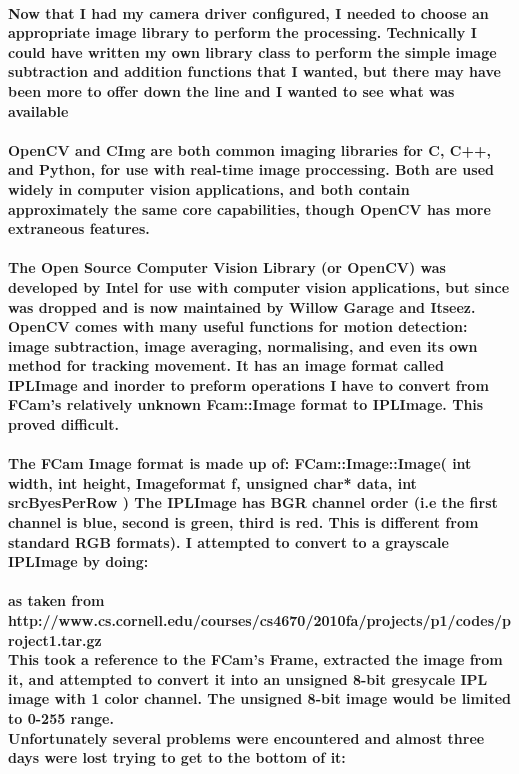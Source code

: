 \documentclass[11pt]{article} %
\begin{document}
\paragraph{Now that I had my camera driver configured, I needed to choose an appropriate image library to perform the processing. Technically I could have written my own library class to perform the simple image subtraction and addition functions that I wanted, but there may have been more to offer down the line and I wanted to see what was available}
\paragraph{OpenCV and CImg are both common imaging libraries for C, C++, and Python, for use with real-time image proccessing. 
Both are used widely in computer vision applications, and both contain approximately the same core capabilities, though OpenCV has more extraneous features.}
\paragraph{The Open Source Computer Vision Library (or OpenCV) was developed by Intel for use with computer vision applications, but since was dropped and is now maintained by Willow Garage and Itseez.
\\OpenCV comes with many useful functions for motion detection: image subtraction, image averaging, normalising, and even its own method for tracking movement. It has an image format called IPLImage and inorder to preform operations I have to convert from FCam's relatively unknown Fcam::Image format to IPLImage. This proved difficult.
}
\paragraph{The FCam Image format is made up of:
FCam::Image::Image(
     int width,
     int height,
     Imageformat f,
     unsigned char* data,
     int srcByesPerRow
)
The IPLImage has BGR channel order (i.e the first channel is blue, second is green, third is red. This is different from standard RGB formats). I attempted to convert to a grayscale IPLImage by doing:}

\paragraph{as taken from http://www.cs.cornell.edu/courses/cs4670/2010fa/projects/p1/codes/project1.tar.gz\\
This took a reference to the FCam's Frame, extracted the image from it, and attempted to convert it into an unsigned 8-bit gresycale IPL image with 1 color channel. The unsigned 8-bit image would be limited to 0-255 range.\\
Unfortunately several problems were encountered and almost three days were lost trying to get to the bottom of it:}
\end{document}
